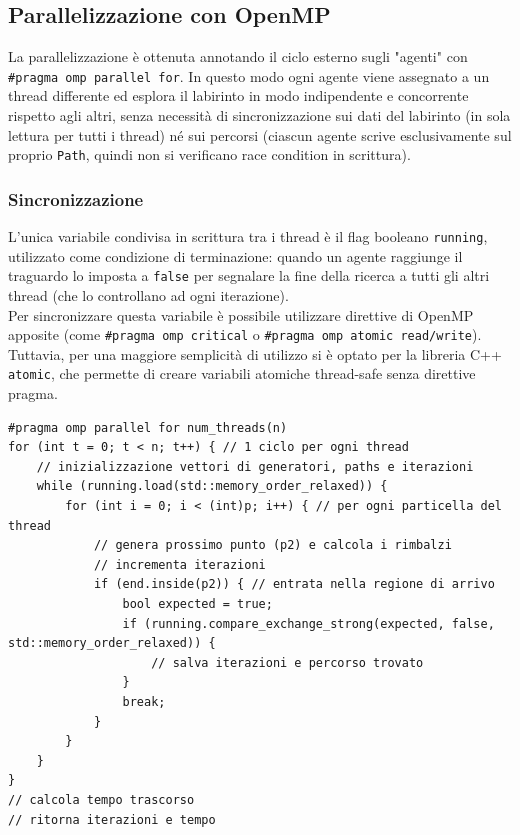 \documentclass{article}
\newcommand{\code}[1]{\texttt{#1}}
\begin{document}
\subsection{Parallelizzazione con OpenMP}
La parallelizzazione è ottenuta annotando il ciclo esterno sugli "agenti" con \code{\#pragma omp parallel for}. In questo modo ogni agente viene assegnato a un thread differente ed esplora il labirinto in modo indipendente e concorrente rispetto agli altri, senza necessità di sincronizzazione sui dati del labirinto (in sola lettura per tutti i thread) né sui percorsi (ciascun agente scrive esclusivamente sul proprio \code{Path}, quindi non si verificano race condition in scrittura).

\subsubsection{Sincronizzazione}
\noindent L'unica variabile condivisa in scrittura tra i thread è il flag booleano \code{running}, utilizzato come condizione di terminazione: quando un agente raggiunge il traguardo lo imposta a \code{false} per segnalare la fine della ricerca a tutti gli altri thread (che lo controllano ad ogni iterazione).\\
\noindent Per sincronizzare questa variabile è possibile utilizzare direttive di OpenMP apposite (come \code{\#pragma omp critical} o \code{\#pragma omp atomic read/write}). Tuttavia, per una maggiore semplicità di utilizzo si è optato per la libreria C++ \code{atomic}, che permette di creare variabili atomiche thread-safe senza direttive pragma.
\\
\begin{lstlisting}[style=visualstudio, caption={Snippet di codice (semplificato) che evidezia il codice di sincronizzazione}, label={lst:code_snippet}]
#pragma omp parallel for num_threads(n)
for (int t = 0; t < n; t++) { // 1 ciclo per ogni thread
    // inizializzazione vettori di generatori, paths e iterazioni
    while (running.load(std::memory_order_relaxed)) {
        for (int i = 0; i < (int)p; i++) { // per ogni particella del thread
            // genera prossimo punto (p2) e calcola i rimbalzi
            // incrementa iterazioni
            if (end.inside(p2)) { // entrata nella regione di arrivo
                bool expected = true;
                if (running.compare_exchange_strong(expected, false, std::memory_order_relaxed)) {
                    // salva iterazioni e percorso trovato
                }
                break;
            }
        }
    }
}
// calcola tempo trascorso
// ritorna iterazioni e tempo
\end{lstlisting}
\end{document}
